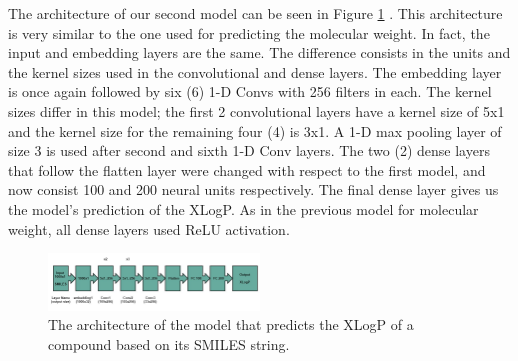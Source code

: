     The  architecture of our second model can be seen in Figure \ref{fig:xlogp-archi1} . This architecture  is very similar to the one used for predicting the molecular weight. In fact, the input and embedding layers are the same. The difference consists in the units and the kernel sizes used in the convolutional and dense layers. The embedding layer is once again followed by six (6) 1-D Convs with 256 filters in each.
    The kernel sizes differ in this model; the first 2 convolutional layers have a kernel size of 5x1 and the kernel size for the remaining four (4)  is 3x1. A 1-D max pooling layer of size 3 is used after second and sixth 1-D Conv layers. The two (2) dense layers that follow the flatten layer 
    were changed with respect to the first model, and  now consist  100 and 200 neural units respectively. The final dense layer gives us the model's prediction of the XLogP. As in the previous model for molecular weight, all dense layers used ReLU activation. 
    
        \begin{figure}[htbp]
        \centering
        \includegraphics[width=0.5\textwidth]{figures/XLogP-model_arquitecture.jpg}
        \caption{The architecture of the model that predicts the XLogP of a compound based on its SMILES string.}
        \label{fig:xlogp-archi1}
    \end{figure}
  

